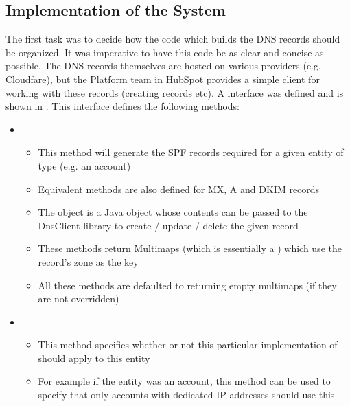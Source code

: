 \subsection{Implementation of the System}
The first task was to decide how the code which builds the DNS records should be organized. It was imperative to have this code be as clear and concise as possible. The DNS records themselves are hosted on various providers (e.g. Cloudfare), but the Platform team in HubSpot provides a simple client for working with these records (creating records etc). A  interface was defined and is shown in  . This interface defines the following methods:

\begin{itemize}

      \item{}
      \begin{itemize}
            \item{This method will generate the SPF records required for a given entity of type  (e.g. an account)}
            \item{Equivalent methods are also defined for MX, A and DKIM records}
            \item{The  object is a Java object whose contents can be passed to the DnsClient library to create / update / delete the given record}
            \item{These methods return Multimaps (which is essentially a ) which use the record's zone as the key}
            \item{All these methods are defaulted to returning empty multimaps (if they are not overridden)}
      \end{itemize}

      \item{}
      \begin{itemize}
            \item{This method specifies whether or not this particular implementation of  should apply to this entity}
            \item{For example if the entity was an account, this method can be used to specify that only accounts with dedicated IP addresses should use this }
      \end{itemize}


\end{itemize}
